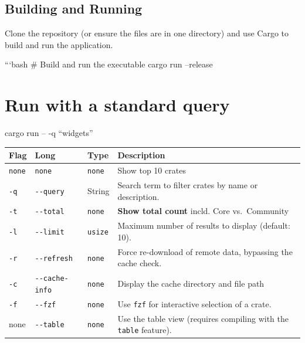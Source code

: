 \documentclass[
  letterpaper,
  DIV=11,
  numbers=noendperiod]{scrreprt}
\begin{document}
\section{Building and Running}\label{building-and-running}

Clone the repository (or ensure the files are in one directory) and use
Cargo to build and run the application.

```bash \# Build and run the executable cargo run --release

\chapter{Run with a standard query}\label{run-with-a-standard-query}

cargo run -- -q ``widgets''

\begin{longtable}[]{@{}
  >{\raggedright\arraybackslash}p{}
  >{\raggedright\arraybackslash}p{}
  >{\raggedright\arraybackslash}p{}
  >{\raggedright\arraybackslash}p{}@{}}
\toprule\noalign{}
\begin{minipage}[b]{\linewidth}\raggedright
Flag
\end{minipage} & \begin{minipage}[b]{\linewidth}\raggedright
Long
\end{minipage} & \begin{minipage}[b]{\linewidth}\raggedright
Type
\end{minipage} & \begin{minipage}[b]{\linewidth}\raggedright
Description
\end{minipage} \\
\midrule\noalign{}
\endhead
\bottomrule\noalign{}
\endlastfoot
\texttt{none} & \texttt{none} & \texttt{none} & Show top 10 crates \\
\texttt{-q} & \texttt{-\/-query} & String & Search term to filter crates
by name or description. \\
\texttt{-t} & \texttt{-\/-total} & \texttt{none} & \textbf{Show total
count} incld. Core vs.~Community \\
\texttt{-l} & \texttt{-\/-limit} & \texttt{usize} & Maximum number of
results to display (default: 10). \\
\texttt{-r} & \texttt{-\/-refresh} & \texttt{none} & Force re-download
of remote data, bypassing the cache check. \\
\texttt{-c} & \texttt{-\/-cache-info} & \texttt{none} & Display the
cache directory and file path \\
\texttt{-f} & \texttt{-\/-fzf} & \texttt{none} & Use \texttt{fzf} for
interactive selection of a crate. \\
none & \texttt{-\/-table} & \texttt{none} & Use the table view (requires
compiling with the \texttt{table} feature). \\
\end{longtable}
\end{document}
